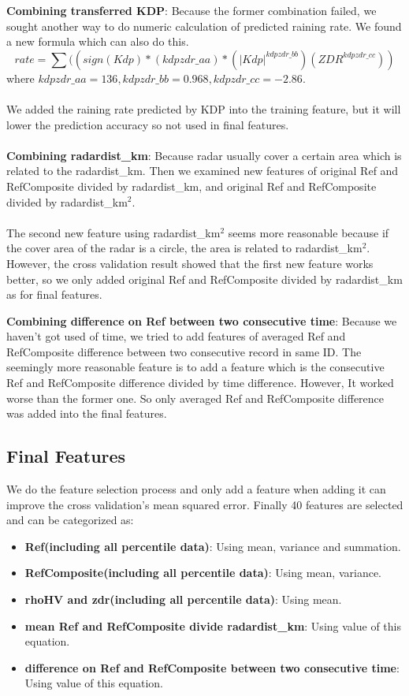 \documentclass{article} %
\begin{document}
\textbf{Combining transferred KDP}: Because the former combination failed, we sought another way to do numeric calculation of predicted raining rate. We found a new formula which can also do this. 
\begin{equation} 
rate = \sum((sign(Kdp)*(kdpzdr\_aa)*(|Kdp|^{kdpzdr\_bb})(ZDR ^ {kdpzdr\_cc}))
\end{equation}
where $kdpzdr\_aa = 136, kdpzdr\_bb = 0.968, kdpzdr\_cc = -2.86$.\\\\
We added the  raining rate predicted by KDP into the training feature, but it will lower the prediction accuracy so not used in final features.\\
\\
\textbf{Combining radardist\_km}: Because radar usually cover a certain area which is related to the radardist\_km. Then we examined new features of original Ref and RefComposite divided by radardist\_km, and original Ref and RefComposite divided by radardist\_km$^2$.\\
\\The second new feature using radardist\_km$^2$ seems more reasonable because if the cover area of the radar is a circle, the area is related to radardist\_km$^2$. However, the cross validation result showed that the first new feature works better, so we only added original Ref and RefComposite divided by radardist\_km as for final features.

\textbf{Combining difference on Ref between two consecutive time}: Because we haven't got used of time, we tried to add features of averaged Ref and RefComposite difference between two consecutive record in same ID. The seemingly more reasonable feature is to add a feature which is the consecutive Ref and RefComposite difference divided by time difference. However, It worked worse than the former one. So only averaged Ref and RefComposite difference was added into the final features.

\subsection{Final Features}
We do the feature selection process and only add a feature when adding it can improve the cross validation's mean squared error. Finally 40 features are selected and can be categorized as:
\begin{itemize}
\item\textbf{Ref(including all percentile data)}: Using mean, variance and summation.
\item\textbf{RefComposite(including all percentile data)}: Using mean, variance.
\item\textbf{rhoHV and zdr(including all percentile data)}: Using mean.
\item\textbf{mean Ref and RefComposite divide radardist\_km}: Using value of this equation.
\item\textbf{difference on Ref and RefComposite between two consecutive time}: Using value of this equation.
\end{itemize}
\end{document}
